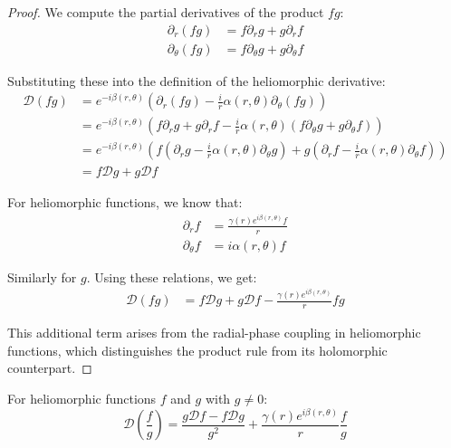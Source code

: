 \begin{proof}
We compute the partial derivatives of the product $fg$:
\begin{align}
\partial_r(fg) &= f\partial_rg + g\partial_rf\\
\partial_\theta(fg) &= f\partial_\theta g + g\partial_\theta f
\end{align}

Substituting these into the definition of the heliomorphic derivative:
\begin{align}
\mathcal{D}(fg) &= e^{-i\beta(r,\theta)}\left(\partial_r(fg) - \frac{i}{r}\alpha(r,\theta)\partial_\theta(fg)\right)\\
&= e^{-i\beta(r,\theta)}\left(f\partial_rg + g\partial_rf - \frac{i}{r}\alpha(r,\theta)(f\partial_\theta g + g\partial_\theta f)\right)\\
&= e^{-i\beta(r,\theta)}\left(f\left(\partial_rg - \frac{i}{r}\alpha(r,\theta)\partial_\theta g\right) + g\left(\partial_rf - \frac{i}{r}\alpha(r,\theta)\partial_\theta f\right)\right)\\
&= f\mathcal{D}g + g\mathcal{D}f
\end{align}

For heliomorphic functions, we know that:
\begin{align}
\partial_rf &= \frac{\gamma(r)e^{i\beta(r,\theta)}f}{r}\\
\partial_\theta f &= i\alpha(r,\theta)f
\end{align}

Similarly for $g$. Using these relations, we get:
\begin{align}
\mathcal{D}(fg) &= f\mathcal{D}g + g\mathcal{D}f - \frac{\gamma(r)e^{i\beta(r,\theta)}}{r}fg
\end{align}

This additional term arises from the radial-phase coupling in heliomorphic functions, which distinguishes the product rule from its holomorphic counterpart.
\end{proof}

\begin{theorem}
For heliomorphic functions $f$ and $g$ with $g \neq 0$:
\begin{equation}
\mathcal{D}\left(\frac{f}{g}\right) = \frac{g\mathcal{D}f - f\mathcal{D}g}{g^2} + \frac{\gamma(r)e^{i\beta(r,\theta)}}{r}\frac{f}{g}
\end{equation}
\end{theorem}

